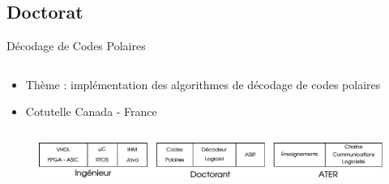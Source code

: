 \documentclass[t,compress,mathserif,12pt,xcolor=dvipsnames]{beamer}
\begin{document}
\subsection{Doctorat}
\begin{frame}[t]{Décodage de Codes Polaires}
  \begin{minipage}[t][5.0cm][t]{\textwidth}
    \begin{columns}
      \begin{column}{0.63\textwidth}
        \vspace{-30pt}
          \begin{itemize}
            \item Thème : implémentation des algorithmes de décodage de codes polaires
            \item Cotutelle Canada - France
          \end{itemize}
      \end{column}
      \begin{column}{0.04\textwidth}

      \end{column}
      \begin{column}{0.33\textwidth}
      \end{column}
    \end{columns}
  \end{minipage}
  \begin{figure}[htp]
    \centering
    \includegraphics[width=\textwidth]{fig/frise}
  \end{figure}
\end{frame}
\end{document}
